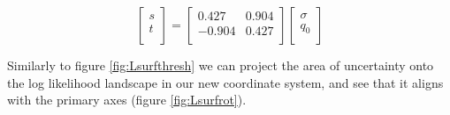\documentclass{article}
\begin{document}
\[
\begin{bmatrix}
s \\
t \\
\end{bmatrix}
 = 
\begin{bmatrix}
   0.427 &  0.904 \\
   -0.904 &  0.427 \\
\end{bmatrix}
\begin{bmatrix}
\sigma \\
q_0 \\
\end{bmatrix}
\]


Similarly to figure \ref{fig:Lsurfthresh} we can project the area of uncertainty onto the log likelihood landscape in our new coordinate system, and see that it aligns with the primary axes (figure \ref{fig:Lsurfrot}).
\end{document}

